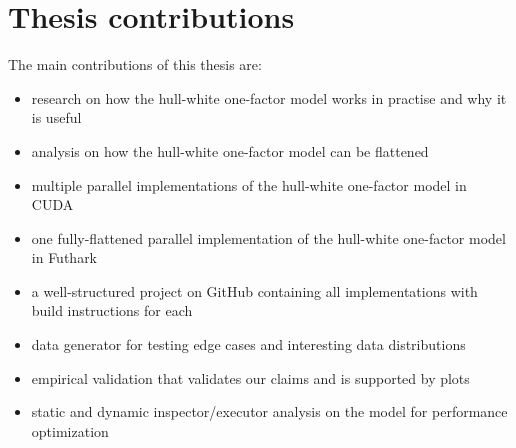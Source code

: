 \newpage
\section{Thesis contributions}
\label{section:thesiscontributions}
The main contributions of this thesis are: 
\begin{itemize}
    \item research on how the hull-white one-factor model works in practise and why it is useful
    \item analysis on how the hull-white one-factor model can be flattened
    \item multiple parallel implementations of the hull-white one-factor model in CUDA
    \item one fully-flattened parallel implementation of the hull-white one-factor model in Futhark
    \item a well-structured project on GitHub containing all implementations with build instructions for each
    \item data generator for testing edge cases and interesting data distributions
    \item empirical validation that validates our claims and is supported by plots
    \item static and dynamic inspector/executor analysis on the model for performance optimization 
\end{itemize}
	
	



